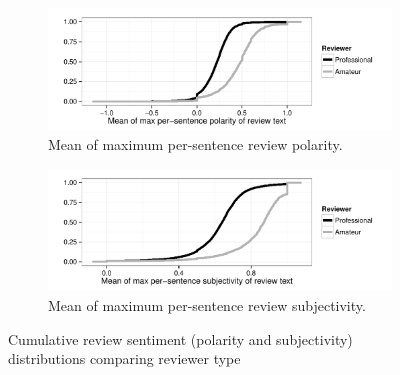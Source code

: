 \documentclass[letterpaper]{article}
\begin{document}
\begin{figure}[tb]
\centering

\begin{subfigure}[b]{\linewidth}
\includegraphics[width=\linewidth]{./console_games_polmaxmean_ecdf}
\caption{Mean of maximum per-sentence review polarity.}
\label{fig:revpol_max}
\end{subfigure}

\begin{subfigure}[b]{\linewidth}
\includegraphics[width=\linewidth]{./console_games_subjmaxmean_ecdf}
\caption{Mean of maximum per-sentence review subjectivity.}
\label{fig:revsubj_max}
\end{subfigure}
\caption{Cumulative review sentiment (polarity and subjectivity) distributions comparing reviewer type}
\label{fig:revsubj_density}
\end{figure}
\end{document}
